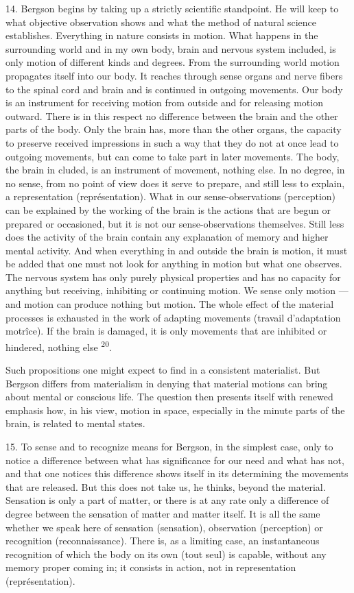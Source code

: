 \documentclass[12pt,a4paper,openany]{book}
\newcommand{\opage}[1]{\marginnote{\footnotesize\textit{[#1]}}}
\newcommand{\nm}[1]{\unskip\textsuperscript{#1}}
\begin{document}
14. Bergson begins by taking up a strictly scientific standpoint. He will keep to what objective observation shows and what the method of natural science establishes. Everything in nature consists in motion. What happens in the surrounding world and in my own body, brain and nervous system included, is only motion of different kinds and degrees. From the surrounding world motion propagates itself into our body. It reaches through sense organs and nerve fibers to the spinal cord and brain and is continued in outgoing movements. Our body is an instrument for receiving motion from outside and for releasing motion outward. There is in this respect no difference between the brain and the other parts of the body. Only the brain has, more than the other organs, the capacity to preserve received impressions in such a way that they do not at once lead to outgoing movements, but can come to take part in later movements. The body, the brain in%
\opage{28}cluded, is an instrument of movement, nothing else. In no degree, in no sense, from no point of view does it serve to prepare, and still less to explain, a representation (représentation). What in our sense-observations (perception) can be explained by the working of the brain is the actions that are begun or prepared or occasioned, but it is not our sense-observations themselves. Still less does the activity of the brain contain any explanation of memory and higher mental activity. And when everything in and outside the brain is motion, it must be added that one must not look for anything in motion but what one observes. The nervous system has only purely physical properties and has no capacity for anything but receiving, inhibiting or continuing motion. We sense only motion --- and motion can produce nothing but motion. The whole effect of the material processes is exhausted in the work of adapting movements (travail d'adaptation motrîce). %
If the brain is damaged, it is only movements that are inhibited or hindered, nothing else \nm{20}.

Such propositions one might expect to find in a consistent materialist. But Bergson differs from materialism in denying that material motions can bring about mental or conscious life. The question then presents itself with renewed emphasis how, in his view, motion in space, especially in the minute parts of the brain, is related to mental states.

15. To sense and to recognize means for Bergson, in the simplest case, only to notice a difference between what has significance for our need and what has not, and that one notices this difference shows itself in its determining the movements that are released. But this does not take us, he thinks, beyond the material. Sensation is only a part of matter, or there is at any rate only a difference of degree between the sensation of matter and matter itself. It is all the same whether we speak here of sensation (sensation), observation (perception) or recognition (reconnaissance). There is, as a limiting case, an instantaneous recognition of which the body on its own
\opage{29}(tout seul) is capable, without any memory proper coming in; it consists in action, not in representation (représentation).
\end{document}
